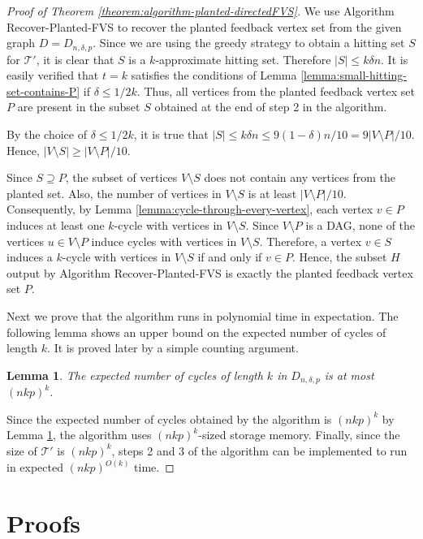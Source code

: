 \documentclass[11pt]{article}
\newtheorem{lemma}[theorem]{Lemma}
\def\T{\mathcal{T}}
\begin{document}
\begin{proof}[Proof of Theorem \ref{theorem:algorithm-planted-directedFVS}]
We use Algorithm Recover-Planted-FVS to recover the planted feedback vertex set from the given graph $D=D_{n,\delta,p}$. Since we are using the greedy strategy to obtain a hitting set $S$ for $\T'$, it is clear that $S$ is a $k$-approximate hitting set. Therefore $|S|\leq k\delta n$. It is easily verified that $t=k$ satisfies the conditions of Lemma \ref{lemma:small-hitting-set-contains-P} if $\delta\leq 1/2k$. Thus, all vertices from the planted feedback vertex set $P$ are present in the subset $S$ obtained at the end of step 2 in the algorithm.

By the choice of $\delta\leq 1/2k$, it is true that $|S|\leq k\delta n\leq 9(1-\delta)n/10=9|V\setminus P|/10$. Hence, $|V\setminus S|\geq |V\setminus P|/10$.

Since $S\supseteq P$, the subset of vertices $V\setminus S$ does not contain any vertices from the planted set. Also, the number of vertices in $V\setminus S$ is at least $|V\setminus P|/10$. Consequently, by Lemma \ref{lemma:cycle-through-every-vertex}, each vertex $v\in P$ induces at least one $k$-cycle with vertices in $V\setminus S$. Since $V\setminus P$ is a DAG, none of the vertices $u\in V\setminus P$ induce cycles with vertices in $V\setminus S$. Therefore, a vertex $v\in S$ induces a $k$-cycle with vertices in $V\setminus S$ if and only if $v\in P$. Hence, the subset $H$ output by Algorithm Recover-Planted-FVS is exactly the planted feedback vertex set $P$.

Next we prove that the algorithm runs in polynomial time in expectation. The following lemma shows an upper bound on the expected number of cycles of length $k$. It is proved later by a simple counting argument.

\begin{lemma}\label{lemma:expected-no-of-cycles}
The expected number of cycles of length $k$ in $D_{n,\delta,p}$ is at most $(nkp)^{k}$.
\end{lemma}
Since the expected number of cycles obtained by the algorithm is $(nkp)^{k}$ by Lemma \ref{lemma:expected-no-of-cycles}, the algorithm uses $(nkp)^k$-sized storage memory. Finally, since the size of $\T'$ is $(nkp)^k$, steps 2 and 3 of the algorithm can be implemented to run in expected $(nkp)^{O(k)}$ time.
\end{proof}

\section{Proofs}
\end{document}
